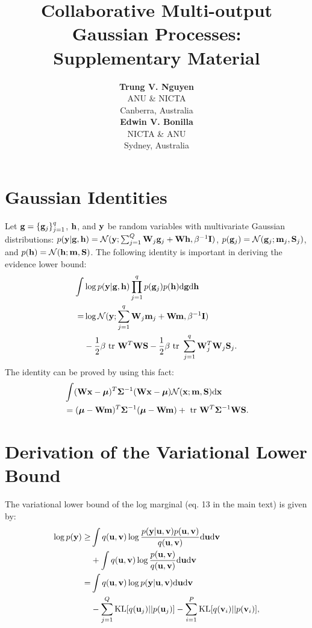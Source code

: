 \documentclass[]{article}
\title{Collaborative Multi-output Gaussian Processes: \\ Supplementary Material}
\author{ {\bf Trung V. Nguyen} \\
ANU \& NICTA \\
Canberra, Australia\\
\And
{\bf Edwin V. Bonilla}  \\
NICTA \& ANU          \\
Sydney, Australia \\
}
\begin{document}
\maketitle

\section{Gaussian Identities}
Let $\mathbf{g} = \{\mathbf{g}_j\}_{j=1}^q$, $\mathbf{h}$, and $\mathbf{y}$ be random variables with multivariate Gaussian distributions: 
$p(\mathbf{y} | \mathbf{g}, \mathbf{h}) = \mathcal{N}(\mathbf{y}; \sum_{j=1}^Q \mathbf{W}_j \mathbf{g}_j + \mathbf{W} \mathbf{h}, \beta^{-1} \mathbf{I})$, $p(\mathbf{g}_j) = \mathcal{N}(\mathbf{g}_j; \mathbf{m}_j, \mathbf{S}_j)$, and $p(\mathbf{h}) = \mathcal{N}(\mathbf{h}; \mathbf{m}, \mathbf{S})$.
The following identity is important in deriving the evidence lower bound:
\begin{align}
\nonumber
\int& \log p(\y | \g, \h) \prod_{j=1}^q p(\g_j) p(\h) \der \g \der \h \\
\nonumber
=& \log \Normal(\y; \sum_{j=1}^q \W_j \m_j + \W \m, \beta^{-1} \I) \\
& - \frac{1}{2} \beta \trace \W^T \W \S - \frac{1}{2} \beta \trace \sum_{j=1}^q \W_j^T \W_j \S_j.
 \label{eq:identity}
\end{align}
The identity can be proved by using this fact: 
\begin{align}
\nonumber
&\int (\mathbf{W}\mathbf{x} - \boldsymbol{\mu})^T \mathbf{\Sigma}^{-1} (\mathbf{W} \mathbf{x} - \boldsymbol{\mu}) \mathcal{N}(\mathbf{x}; \mathbf{m}, \mathbf{S}) \mathrm{d} \mathbf{x} \\
&= (\boldsymbol{\mu} - \mathbf{W}\mathbf{m})^T \mathbf{\Sigma}^{-1} (\boldsymbol{\mu} - \mathbf{W}\mathbf{m}) + \mbox{ \rm tr } \mathbf{W}^T \mathbf{\Sigma}^{-1} \mathbf{W} \mathbf{S}.
\end{align}


\section{Derivation of the Variational Lower Bound}
The variational lower bound of the log marginal (eq. 13 in the main text) is given by:
\begin{align}
\nonumber
\log p(\mathbf{y}) \ge& \int q(\mathbf{u}, \mathbf{v}) \log \frac{p(\mathbf{y} | \mathbf{u}, \mathbf{v}) p(\mathbf{u}, \mathbf{v})}{q(\mathbf{u}, \mathbf{v})} \mathrm{d} \mathbf{u} \mathrm{d} \mathbf{v} \\
\nonumber
&+ \int q(\mathbf{u}, \mathbf{v}) \log \frac{p(\mathbf{u}, \mathbf{v})}{q(\mathbf{u}, \mathbf{v})} \mathrm{d} \mathbf{u} \mathrm{d} \mathbf{v} \\
\nonumber
=& \int q(\mathbf{u}, \mathbf{v}) \log p(\mathbf{y} | \mathbf{u}, \mathbf{v})  \mathrm{d} \mathbf{u} \mathrm{d} \mathbf{v} \\
\nonumber
&- \sum_{j=1}^Q \text{KL}[q(\mathbf{u}_j) || p(\mathbf{u}_j)] - \sum_{i=1}^P \text{KL}[q(\mathbf{v}_i) || p(\mathbf{v}_i)],
\end{align}
\end{document}
